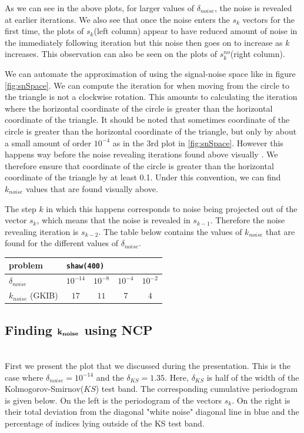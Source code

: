 \documentclass[11pt]{amsart}
\begin{document}
	
	As we can see in the above plots, for larger values of $\delta_{noise}$, the
	noise is revealed at earlier iterations. We also see that once the noise enters
	the $s_k$ vectors for the first time, the plots of $s_k$(left column) appear to have 
	reduced amount of noise in the immediately following iteration but this 
	noise then goes on to increase as $k$ increases. This observation can also be seen on the
	plots of $s_{k}^{no}$(right column).
	
We can automate the approximation of using the signal-noise space like in figure \ref{fig:snSpace}.
We can compute the iteration for when moving from the circle to the triangle is not a clockwise
rotation. This amounts to calculating the iteration where the horizontal coordinate of the circle is greater
than the horizontal coordinate of the triangle. It should be noted that sometimes coordinate of the 
circle is greater than the horizontal coordinate of the triangle, but only by about a small  amount of 
order $10^{-4}$ as in the 3rd plot in \ref{fig:snSpace}.
However this happens way before the noise revealing iterations found above visually . We therefore
ensure that coordinate of the circle is greater than the horizontal coordinate of the triangle by at least 0.1. 
Under this convention, we can find $k_{noise}$ values that are found visually above.

The step $k$ in which this happens corresponds to noise being projected out of the vector $s_k$,
which means that the noise is revealed in $s_{k-1}$. Therefore the noise revealing iteration 
is $s_{k-2}$. The table below contains the values of $k_{noise}$ that are found for the different 
values of $\delta_{noise}$.

\begin{center}
    \begin{tabular}{l||c|c|c|c}
      \multicolumn{1}{l||}{problem} & \multicolumn{4}{l}{\texttt{shaw(400)}} \\
      \hline \hline 
      $\delta_{noise}$ & $10^{-14}$ & $10^{-8}$ & $10^{-4}$ & $10^{-2}$ \\
      \hline
      $k_{noise}$ (GKIB) & $17$ & $11$ & $7$ & $4$ \\
          \end{tabular}
  \end{center}

\subsection{Finding $\bf k_{noise}$ using NCP} \indent \\
First we present the plot that we discussed during the presentation. This is the case where
$\delta_{noise} = 10^{-14}$  and the $\delta_{KS}=1.35$. Here, $\delta_{KS}$ is half of the
width of the Kolmogorov-Smirnov($KS$) test band. The corresponding cumulative periodogram is given below. 
On the left is the periodogram of the vectors $s_k$. On the right is their total deviation from 
the diagonal "white noise" diagonal line in blue and the percentage of indices lying outside of the KS test band.
\end{document}
